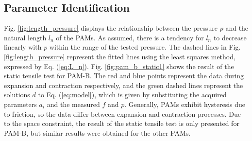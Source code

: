 \subsection{Parameter Identification}
Fig. \ref{fig:length_pressure} displays the relationship between the pressure $p$ and the natural length $l_n$ of the PAMs. As assumed, there is a tendency for $l_n$ to decrease linearly with $p$ within the range of the tested pressure. The dashed lines in Fig. \ref{fig:length_pressure} represent the fitted lines using the least squares method, expressed by Eq. (\ref{eq:L_n}).
Fig. \ref{fig:pam_b_static1} shows the result of the static tensile test for PAM-B. The red and blue points represent the data during expansion and contraction respectively, and the green dashed lines represent the solutions $d$ to Eq. (\ref{eq:model}), which is given by substituting the acquired parameters $a_i$ and the measured $f$ and $p$.
Generally, PAMs exhibit hysteresis due to friction, so the data differ between expansion and contraction processes. Due to the space constraint, the result of the static tensile test is only presented for PAM-B, but similar results were obtained for the other PAMs.

